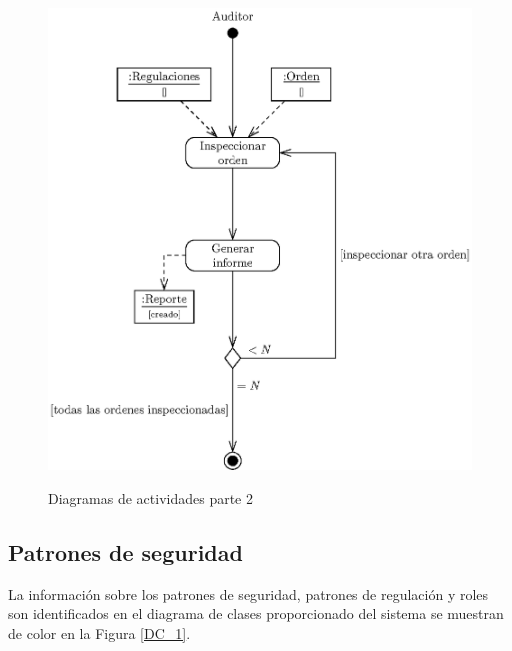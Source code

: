 \begin{figure}[hpt!]
\begin{center}
{    		\includegraphics[scale=0.6]{Imagenes/diag_activity_checkTrade_esp.eps}}
 	\caption{Diagramas de actividades parte 2}
 \end{center}
\end{figure}

\subsection{Patrones de seguridad}

La información sobre los patrones de seguridad, patrones de regulación y roles son identificados en el diagrama de clases proporcionado del sistema se muestran de color en la Figura \ref{DC_1}. 

